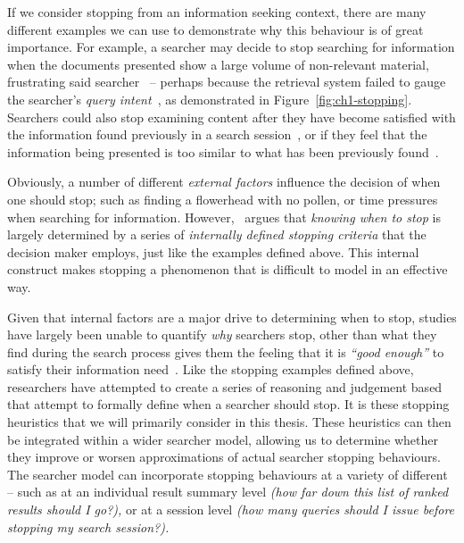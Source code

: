 If we consider stopping from an information seeking context, there are many different examples we can use to demonstrate why this behaviour is of great importance. For example, a searcher may decide to stop searching for information when the documents presented show a large volume of non-relevant material, frustrating said searcher~\citep{cooper1973retrieval_effectiveness_ii} -- perhaps because the retrieval system failed to gauge the searcher's \emph{query intent}~\citep{ashkan2009classifying}, as demonstrated in Figure~\ref{fig:ch1-stopping}. Searchers could also stop examining content after they have become satisfied with the information found previously in a search session~\citep{cooper1973retrieval_effectiveness, gibb1958number_rule, simon1955satiation}, or if they feel that the information being presented is too similar to what has been previously found~\citep{nickles1995judgment}.

Obviously, a number of different \emph{external factors} influence the decision of when one should stop; such as finding a flowerhead with no pollen, or time pressures when searching for information. However,~\cite{nickles1995judgment} argues that \emph{knowing when to stop} is largely determined by a series of \emph{internally defined stopping criteria} that the decision maker employs, just like the examples defined above. This internal construct makes stopping a phenomenon that is difficult to model in an effective way.

Given that internal factors are a major drive to determining when to stop, studies have largely been unable to quantify \emph{why} searchers stop, other than what they find during the search process gives them the feeling that it is \emph{``good enough''} to satisfy their information need~\citep{zach2005enough_is_enough}. Like the stopping examples defined above, researchers have attempted to create a series of reasoning and judgement based  that attempt to formally define when a searcher should stop. It is these stopping heuristics that we will primarily consider in this thesis. These heuristics can then be integrated within a wider searcher model, allowing us to determine whether they improve or worsen approximations of actual searcher stopping behaviours. The searcher model can incorporate stopping behaviours at a variety of different  -- such as at an individual result summary level \emph{(how far down this list of ranked results should I go?),} or at a session level \emph{(how many queries should I issue before stopping my search session?).}

